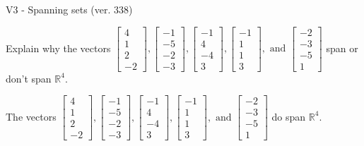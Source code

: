 \begin{exercise}
  \begin{exerciseTitle}V3 - Spanning sets (ver. 338)\end{exerciseTitle}
  \begin{exerciseStatement}
    Explain why the vectors \(\left[\begin{array}{r}
4 \\
1 \\
2 \\
-2
\end{array}\right] , \left[\begin{array}{r}
-1 \\
-5 \\
-2 \\
-3
\end{array}\right] , \left[\begin{array}{r}
-1 \\
4 \\
-4 \\
3
\end{array}\right] , \left[\begin{array}{r}
-1 \\
1 \\
1 \\
3
\end{array}\right] , \text{ and } \left[\begin{array}{r}
-2 \\
-3 \\
-5 \\
1
\end{array}\right]\) span or don't span \(\mathbb{R}^4\). 
	


  \end{exerciseStatement}
  \begin{exerciseAnswer}
   The vectors \(\left[\begin{array}{r}
4 \\
1 \\
2 \\
-2
\end{array}\right] , \left[\begin{array}{r}
-1 \\
-5 \\
-2 \\
-3
\end{array}\right] , \left[\begin{array}{r}
-1 \\
4 \\
-4 \\
3
\end{array}\right] , \left[\begin{array}{r}
-1 \\
1 \\
1 \\
3
\end{array}\right] , \text{ and } \left[\begin{array}{r}
-2 \\
-3 \\
-5 \\
1
\end{array}\right]\) 
  	 do  
	span \(\mathbb{R}^4\).
  



\end{exerciseAnswer}
\end{exercise}
